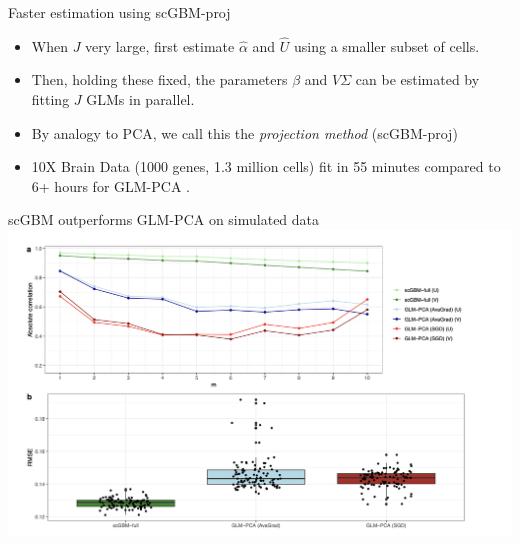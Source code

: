 \documentclass[aspectratio=43]{beamer}
\begin{document}
\begin{frame}{Faster estimation using scGBM-proj}

\begin{itemize}
\item When $J$ very large, first estimate $\hat{\alpha}$ and $\hat{U}$ using a smaller subset of cells. 
\item Then, holding these fixed, the parameters $\beta$ and $V \Sigma$ can be estimated by fitting $J$ GLMs in parallel. 
\item By analogy to PCA, we call this the \textit{projection method} (scGBM-proj)
\item 10X Brain Data (1000 genes, 1.3 million cells) fit in {\color{red} 55 minutes} compared to {\color{red} 6+ hours} for GLM-PCA \cite{townes2019feature}.
\end{itemize}

\end{frame}

\begin{frame}{scGBM outperforms GLM-PCA on simulated data}
\centering
\includegraphics[scale=0.35]{Fig/glmpca-simaccuracy.png}
\end{frame}
\end{document}

